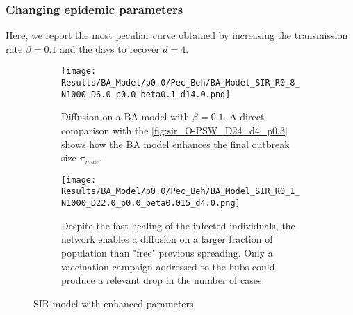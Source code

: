 \documentclass[a4paper,10pt,twoside]{book} %
\theoremstyle{definition}
\begin{document}
\subsubsection{Changing epidemic parameters}
Here, we report the most peculiar curve obtained by increasing the transmission rate $ \beta = 0.1$ and the days to recover $ d = 4$. 
\begin{figure}[H]
	\begin{subfigure}{\linewidth}
		\centering
		\texttt{[image: Results/BA\_Model/p0.0/Pec\_Beh/BA\_Model\_SIR\_R0\_8\_N1000\_D6.0\_p0.0\_beta0.1\_d14.0.png]}
		\caption{Diffusion on a BA model with $\beta = 0.1$. A direct comparison with the \autoref{fig:sir_O-PSW_D24_d4_p0.3} shows how the BA model enhances the final outbreak size $\pi_{max}$.}
		\label{fig:sir_BA_D6_b0.1}
	\end{subfigure}
	\par\bigskip
	\begin{subfigure}{\linewidth}
		\centering
		\texttt{[image: Results/BA\_Model/p0.0/Pec\_Beh/BA\_Model\_SIR\_R0\_1\_N1000\_D22.0\_p0.0\_beta0.015\_d4.0.png]}
		\caption{Despite the fast healing of the infected individuals, the network enables a diffusion on a larger fraction of population than "free" previous spreading. Only a vaccination campaign addressed to the hubs could produce a relevant drop in the number of cases.}
		\label{fig:sir_BA_d4D22}
	\end{subfigure}
	\caption{SIR model with enhanced parameters}
\end{figure}

\clearpage
\end{document}
